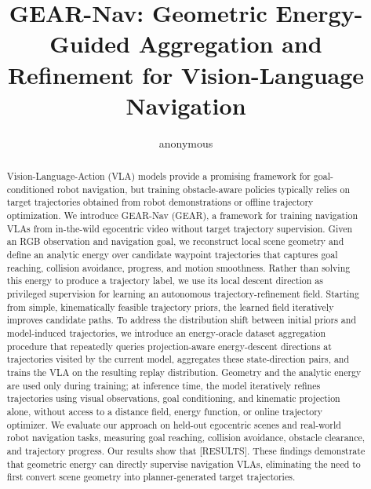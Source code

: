 \documentclass[letterpaper, 10 pt, conference]{ieeeconf}  %
\title{\LARGE \bf
GEAR-Nav: Geometric Energy-Guided Aggregation and Refinement for Vision-Language Navigation
}
\author{anonymous
}
\begin{document}



\maketitle
\thispagestyle{empty}
\pagestyle{empty}


\begin{abstract}

Vision-Language-Action (VLA) models provide a promising framework for goal-conditioned robot navigation, but training obstacle-aware policies typically relies on target trajectories obtained from robot demonstrations or offline trajectory optimization. We introduce GEAR-Nav (GEAR), a framework for training navigation VLAs from in-the-wild egocentric video without target trajectory supervision. Given an RGB observation and navigation goal, we reconstruct local scene geometry and define an analytic energy over candidate waypoint trajectories that captures goal reaching, collision avoidance, progress, and motion smoothness. Rather than solving this energy to produce a trajectory label, we use its local descent direction as privileged supervision for learning an autonomous trajectory-refinement field. Starting from simple, kinematically feasible trajectory priors, the learned field iteratively improves candidate paths. To address the distribution shift between initial priors and model-induced trajectories, we introduce an energy-oracle dataset aggregation procedure that repeatedly queries projection-aware energy-descent directions at trajectories visited by the current model, aggregates these state-direction pairs, and trains the VLA on the resulting replay distribution. Geometry and the analytic energy are used only during training; at inference time, the model iteratively refines trajectories using visual observations, goal conditioning, and kinematic projection alone, without access to a distance field, energy function, or online trajectory optimizer. We evaluate our approach on held-out egocentric scenes and real-world robot navigation tasks, measuring goal reaching, collision avoidance, obstacle clearance, and trajectory progress. Our results show that [RESULTS]. These findings demonstrate that geometric energy can directly supervise navigation VLAs, eliminating the need to first convert scene geometry into planner-generated target trajectories.

\end{abstract}
\end{document}
